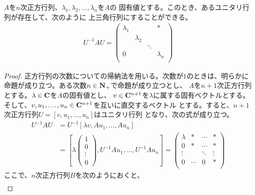 {	\begin{proposition}[正方行列の三角化]\label{prop:正方行列の三角化} %
		$A$を$n$次正方行列、$\lambda_1,\lambda_2,\dots,\lambda_n$を$A$の
		固有値とする。このとき、あるユニタリ行列が存在して、次のように
		上三角行列にすることができる。
		\begin{equation*}\begin{split}
			U^{-1}AU = 	\begin{pmatrix}
				\lambda_1 & & & * \\
				& \lambda_2 \\
				& & \ddots \\
				0 & & & \lambda_n \\
			\end{pmatrix}
		\end{split}\end{equation*}
	\end{proposition} %
	\begin{proof} %
		正方行列の次数についての帰納法を用いる。次数が$1$のときは、明らかに
		命題が成り立つ。ある次数$n\in\mathbf{N}_+$で命題が成り立つとし、
		$A$を$n+1$次正方行列とする。$\lambda\in\mathbf{C}$を$A$の固有値とし、
		$v\in\mathbf{C}^{n+1}$を$\lambda$に属する固有ベクトルとする。
		そして、$v,u_1,\dots,u_n\in\mathbf{C}^{n+1}$を互いに直交するベクトル
		とする。すると、$n+1$次正方行列$U=[v,u_1,\dots,u_n]$はユニタリ行列
		となり、次の式が成り立つ。
		\begin{equation*}\begin{split}
			U^{-1}AU &= U^{-1}[\lambda v,Au_1,\dots,Au_n] \\
			&= \left[\lambda\begin{pmatrix}
				1 \\ 0 \\ \vdots \\ 0
			\end{pmatrix},U^{-1}Au_1,\dots,U^{-1}Au_n\right] = \begin{pmatrix}
				\lambda & * & \cdots & * \\
				0 & * & \cdots & * \\
				\vdots & & \ddots & \vdots \\
				0 & \cdots & 0 & * \\
			\end{pmatrix}
		\end{split}\end{equation*}
		ここで、$n$次正方行列$B$を次のようにおくと、
		\begin{equation*}\begin{split}

\end{split}
\end{equation*}
\end{proof}}
